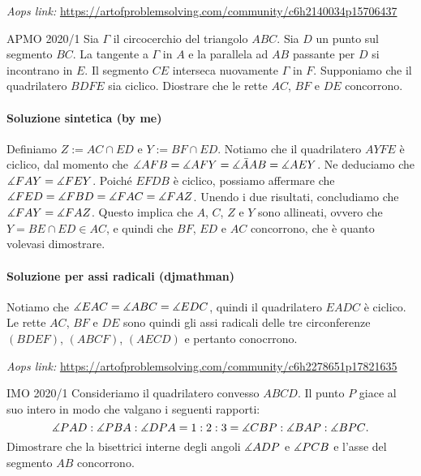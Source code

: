 \documentclass{article}
\begin{document}
\vspace{0.5cm}
\textit{Aops link:}
\href{https://artofproblemsolving.com/community/c6h2140034p15706437}
{https://artofproblemsolving.com/community/c6h2140034p15706437}

\begin{proposition}{APMO 2020/1}{}
	Sia $\Gamma$ il circocerchio del triangolo $ABC$. Sia $D$ un punto sul
	segmento $BC$. La tangente a $\Gamma$ in $A$ e la parallela ad $AB$
	passante per $D$ si incontrano in $E$. Il segmento $CE$ interseca
	nuovamente $\Gamma$ in $F$. Supponiamo che il quadrilatero $BDFE$ sia
	ciclico. Diostrare che le rette $AC$, $BF$ e $DE$ concorrono.
\end{proposition}

\paragraph{Soluzione sintetica (by me)}
Definiamo $Z:=AC\cap ED$ e $Y:=BF\cap ED$. Notiamo che
il quadrilatero $AYFE$ è ciclico, dal momento che
$\measuredangle{AFB}=\measuredangle{AFY}=\measuredangle{\bar{A}AB}=\measuredangle{AEY}$.
Ne deduciamo che $\measuredangle{FAY}=\measuredangle{FEY}$.
Poiché $EFDB$ è ciclico, possiamo affermare che
$\measuredangle{FED}=\measuredangle{FBD}=\measuredangle{FAC}=\measuredangle{FAZ}$.
Unendo i due risultati, concludiamo che $\measuredangle{FAY}=\measuredangle{FAZ}$.
Questo implica che $A$, $C$, $Z$ e $Y$ sono allineati, ovvero che
$Y=BE\cap ED \in AC$, e quindi che $BF$, $ED$ e $AC$ concorrono,
che è quanto volevasi dimostrare.

\paragraph{Soluzione per assi radicali (djmathman)}
Notiamo che $\measuredangle{EAC}=\measuredangle{ABC}=\measuredangle{EDC}$,
quindi il quadrilatero $EADC$ è ciclico. Le rette $AC$, $BF$ e $DE$
sono quindi gli assi radicali delle tre circonferenze
$(BDEF)$, $(ABCF)$, $(AECD)$ e pertanto conocrrono.

\vspace{0.5cm}

\begin{minipage}{\textwidth}
\textit{Aops link:}
\href{https://artofproblemsolving.com/community/c6h2278651p17821635}
{https://artofproblemsolving.com/community/c6h2278651p17821635}

\begin{proposition*}{IMO 2020/1}{}
	Consideriamo il quadrilatero convesso $ABCD$.
	Il punto $P$ giace al suo intero in modo che valgano i seguenti rapporti:
	\begin{equation*}
		\measuredangle{PAD}:\measuredangle{PBA}:\measuredangle{DPA}=1:2:3=\measuredangle{CBP}:\measuredangle{BAP}:\measuredangle{BPC}.
	\end{equation*}
	Dimostrare che la bisettrici interne degli angoli $\measuredangle{ADP}$ e
	$\measuredangle{PCB}$ e l'asse del segmento $AB$ concorrono.
\end{proposition*}
\end{minipage}
\end{document}
